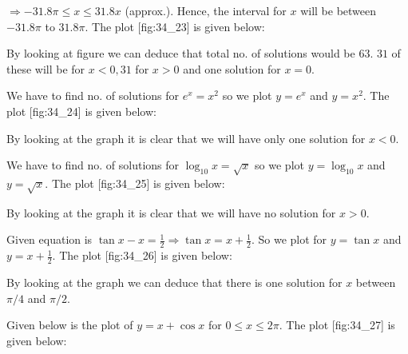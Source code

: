   $\Rightarrow -31.8\pi\leq x\leq 31.8x$ (approx.). Hence, the interval for $x$ will be
  between $-31.8\pi$ to $31.8\pi$. The plot [fig:34_23] is given below:

  \startplacefigure[title={Plot of $\sin x$ and $\frac{x}{100}$}, reference=fig:34_23]
    \externalfigure[34_23.pdf]
  \stopplacefigure

  By looking at figure we can deduce that total no. of solutions would be $63$. $31$ of these
  will be for $x < 0, 31$ for $x > 0$ and one solution for $x = 0$.

\item We have to find no. of solutions for $e^x = x^2$ so we plot $y = e^x$ and $y = x^2$.
  The plot [fig:34_24] is given below:

  \startplacefigure[title={Plot of $e^x$ and $x^2$}, reference=fig:34_24]
    \externalfigure[34_24.pdf]
  \stopplacefigure

  By looking at the graph it is clear that we will have only one solution for $x < 0$.

\item We have to find no. of solutions for $\log_{10}x = \sqrt{x}$ so we plot $y = \log_{10}x$ and
  $y = \sqrt{x}$. The plot [fig:34_25] is given below:

  \startplacefigure[title={Plot of $\log x$ and $\sqrt{x}$}, reference=fig:34_25]
    \externalfigure[34_25.pdf]
  \stopplacefigure

  By looking at the graph it is clear that we will have no solution for $x > 0$.

\item Given equation is $\tan x - x = \frac{1}{2} \Rightarrow \tan x = x + \frac{1}{2}$. So we plot for
  $y = \tan x$ and $y = x + \frac{1}{2}$. The plot [fig:34_26] is given below:

  \startplacefigure[title={Plot of $\tan x$ and $x + \frac{1}{2}$}, reference=fig:34_26]
    \externalfigure[34_26.pdf]
  \stopplacefigure

  By looking at the graph we can deduce that there is one solution for $x$ between $\pi/4$ and
  $\pi/2$.

\item Given below is the plot of $y = x + \cos x$ for $0\leq x\leq 2\pi$. The plot [fig:34_27] is given below:

  \startplacefigure[title={Plot of $x + \cos x$}, reference=fig:34_27]
    \externalfigure[34_27.pdf]
  \stopplacefigure

